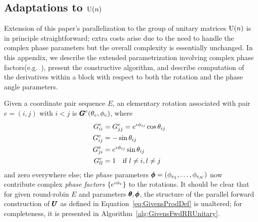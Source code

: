 \documentclass[superscriptaddress,floatfix]{article}
\begin{document}
\begin{appendices}
\section{Adaptations to $\textrm{U}(n)$}
\label{sec:Appendix:Unitaries}

Extension of this paper's parallelization to the group of unitary
matrices $\textrm{U}(n)$ is in principle straightforward; extra costs arise
due to the need to handle the complex phase parameters but the overall
complexity is essentially unchanged. In this appendix, we describe the
extended parametrization involving complex phase
factors(e.g.~\cite{clements2016optimal}), present the constructive
algorithm, and describe computation of the derivatives within a block
with respect to both the rotation and the phase angle parameters.

Given a coordinate pair sequence $E$, an elementary rotation
associated with pair $e = (i,j)$ with $i<j$ is ${\pmb{G}}^e(\theta_e, \phi_e)$, where
\begin{align}
  G^e_{ii} & = G^e_{jj} = e^{\iota\phi_{ij}}\cos \theta_{ij} \nonumber \\
  G^e_{ij}  & = -\sin \theta_{ij} \nonumber \\
  G^e_{ji}  & =  e^{\iota\phi_{ij}}\sin \theta_{ij} \nonumber \\
  G^e_{ll}  & = 1  \text{\quad if } l \neq i, l \neq j 
\end{align}
and zero everywhere else; the \emph{phase} parameters
${\pmb{\phi}} = (\phi_{e_1}, \ldots, \phi_{e_{\mathcal{N}}})$ now contribute complex
\emph{phase factors} $\{ e^{\iota\phi_e} \}$ to the rotations. It
should be clear that for given round-robin $E$ and parameters
${\pmb{\theta}}, {\pmb{\phi}}$, the structure of the parallel forward construction
of ${\pmb{U}}$ as defined in Equation~\ref{eq:GivensProdDef} is unaltered;
for completeness, it is presented in
Algorithm~\ref{alg:GivensFwdRRUnitary}.


\end{appendices}
\end{document}
